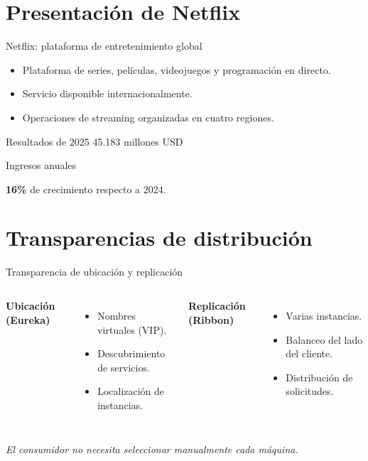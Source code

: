 
\section{Presentación de Netflix}

\begin{frame}{Netflix: plataforma de entretenimiento global}
    \begin{itemize}
        \item Plataforma de series, películas, videojuegos y programación en directo.
        \item Servicio disponible internacionalmente.
        \item Operaciones de streaming organizadas en cuatro regiones.
    \end{itemize}

    \vspace{0.3cm}

    \begin{block}{Resultados de 2025}
        \centering
        {\Large 45.183 millones USD}

        Ingresos anuales

        \vspace{0.15cm}
        \textbf{16\%} de crecimiento respecto a 2024.
    \end{block}

    \parencite{netflix2025annual}
\end{frame}


\section{Transparencias de distribución}

\begin{frame}{Transparencia de ubicación y replicación}
    \begin{columns}[T]
        \textbf{Ubicación (Eureka)}

        \begin{itemize}
            \item Nombres virtuales (VIP).
            \item Descubrimiento de servicios.
            \item Localización de instancias.
        \end{itemize}

        \textbf{Replicación (Ribbon)}

        \begin{itemize}
            \item Varias instancias.
            \item Balanceo del lado del cliente.
            \item Distribución de solicitudes.
        \end{itemize}
    \end{columns}

    \vspace{0.3cm}
    \centering
    \textit{El consumidor no necesita seleccionar manualmente cada máquina.}

    \parencite{vroom2023mesh}
\end{frame}


